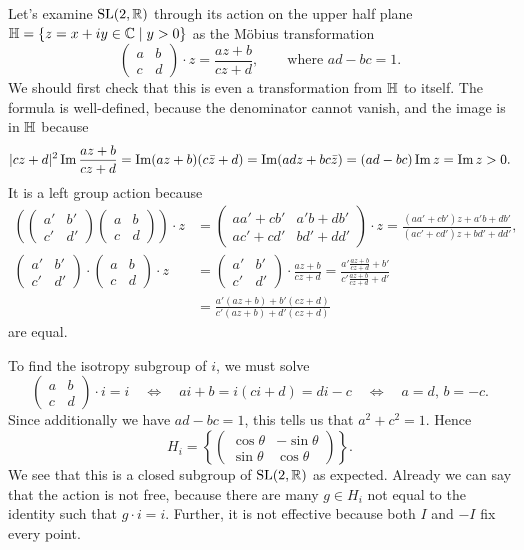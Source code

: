 \begin{example}
\label{eg:sl2r action on half plane}
Let's examine $\mathrm{SL}(2,\mathbb{R})$ through its action on the upper half plane $\mathbb{H} = \{ z = x + iy \in \mathbb{C} \mid y > 0\}$ as the Möbius transformation
\[
\begin{pmatrix}
a & b \\ c & d
\end{pmatrix} \cdot z 
= \frac{az + b}{cz + d}, \qquad \text{where } ad - bc = 1.
\]
We should first check that this is even a transformation from $\mathbb{H}$ to itself.
The formula is well-defined, because the denominator cannot vanish, and the image is in $\mathbb{H}$ because
\[
|cz+d|^2 \operatorname{Im} \frac{az + b}{cz + d}
= \operatorname{Im} (az + b)(c\bar{z} + d)
= \operatorname{Im} (ad z + bc \bar{z})
= (ad-bc)\operatorname{Im} z
= \operatorname{Im} z
> 0.
\]
It is a left group action because
\begin{align*}
\left(\begin{pmatrix}
a' & b' \\ c' & d'
\end{pmatrix}\begin{pmatrix}
a & b \\ c & d
\end{pmatrix} \right) \cdot z
&= \begin{pmatrix}
aa' + cb' & a'b+db' \\ ac'+cd' & bd'+dd'
\end{pmatrix} \cdot z
= \frac{(aa' + cb')z + a'b+db'}{(ac'+cd')z + bd'+dd'}, \\
\begin{pmatrix}
a' & b' \\ c' & d'
\end{pmatrix} \cdot \begin{pmatrix}
a & b \\ c & d
\end{pmatrix} \cdot z
&= \begin{pmatrix}
a' & b' \\ c' & d'
\end{pmatrix} \cdot \frac{az + b}{cz + d}
= \frac{a'\frac{az + b}{cz + d} + b'}{c'\frac{az + b}{cz + d} + d'} \\
&= \frac{a'(az + b) + b'(cz + d)}{c'(az + b) + d'(cz + d)}
\end{align*}
are equal.

To find the isotropy subgroup of $i$, we must solve
\[
\begin{pmatrix}
a & b \\ c & d
\end{pmatrix} \cdot i = i
\quad\Leftrightarrow\quad
ai + b = i(ci + d) = di - c
\quad\Leftrightarrow\quad
a = d,\, b = - c.
\]
Since additionally we have $ad - bc = 1$, this tells us that $a^2 + c^2 = 1$.
Hence
\[
H_i = \left\{ \begin{pmatrix}
\cos\theta & -\sin\theta \\ \sin\theta & \cos\theta
\end{pmatrix} \right\}.
\]
We see that this is a closed subgroup of $\mathrm{SL}(2,\mathbb{R})$ as expected.
Already we can say that the action is not free, because there are many $g \in H_i$ not equal to the identity such that $g\cdot i = i$.
Further, it is not effective because both $I$ and $-I$ fix every point.


\end{example}
